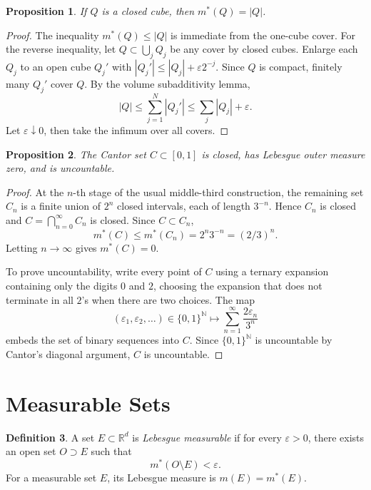 \documentclass[11pt,openany]{book}
\numberwithin{equation}{chapter}
\theoremstyle{definition}
\newtheorem{definition}{Definition}[chapter]
\theoremstyle{plain}
\newtheorem{proposition}[definition]{Proposition}
\theoremstyle{remark}
\newcommand{\R}{\mathbb{R}}
\newcommand{\N}{\mathbb{N}}
\newcommand{\eps}{\varepsilon}
\newcommand{\1}{\mathbf{1}}
\newcommand{\abs}[1]{\left\lvert #1\right\rvert}
\begin{document}
\begin{proposition}
If \(Q\) is a closed cube, then \(m^*(Q)=\abs{Q}\).
\end{proposition}

\begin{proof}
The inequality \(m^*(Q)\le\abs{Q}\) is immediate from the one-cube cover.  For the reverse inequality, let \(Q\subset\bigcup_j Q_j\) be any cover by closed cubes.  Enlarge each \(Q_j\) to an open cube \(Q_j'\) with \(\abs{Q_j'}\le\abs{Q_j}+\eps 2^{-j}\).  Since \(Q\) is compact, finitely many \(Q_j'\) cover \(Q\).  By the volume subadditivity lemma,
\[
    \abs{Q}\le \sum_{j=1}^N\abs{Q_j'}\le \sum_j\abs{Q_j}+\eps.
\]
Let \(\eps\downarrow0\), then take the infimum over all covers.
\end{proof}

\begin{proposition}
The Cantor set \(C\subset[0,1]\) is closed, has Lebesgue outer measure zero, and is uncountable.
\end{proposition}

\begin{proof}
At the \(n\)-th stage of the usual middle-third construction, the remaining set \(C_n\) is a finite union of \(2^n\) closed intervals, each of length \(3^{-n}\).  Hence \(C_n\) is closed and \(C=\bigcap_{n=0}^\infty C_n\) is closed.  Since \(C\subset C_n\),
\[
    m^*(C)\le m^*(C_n)=2^n3^{-n}=(2/3)^n.
\]
Letting \(n\to\infty\) gives \(m^*(C)=0\).

To prove uncountability, write every point of \(C\) using a ternary expansion containing only the digits \(0\) and \(2\), choosing the expansion that does not terminate in all \(2\)'s when there are two choices.  The map
\[
    (\varepsilon_1,\varepsilon_2,\ldots)\in\{0,1\}^{\N}
    \longmapsto \sum_{n=1}^\infty \frac{2\varepsilon_n}{3^n}
\]
embeds the set of binary sequences into \(C\).  Since \(\{0,1\}^{\N}\) is uncountable by Cantor's diagonal argument, \(C\) is uncountable.
\end{proof}

\section{Measurable Sets}

\begin{definition}
A set \(E\subset\R^d\) is \emph{Lebesgue measurable} if for every \(\eps>0\), there exists an open set \(O\supset E\) such that
\[
    m^*(O\setminus E)<\eps.
\]
For a measurable set \(E\), its Lebesgue measure is \(m(E)=m^*(E)\).
\end{definition}
\end{document}
